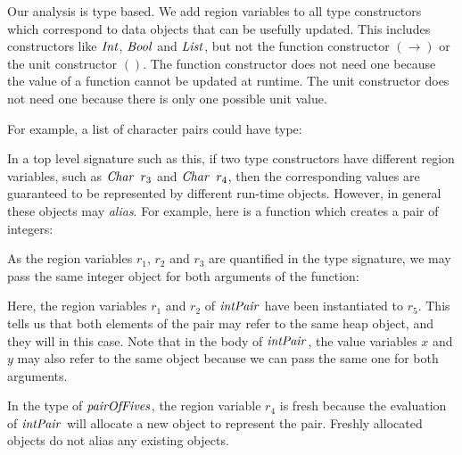 Our analysis is type based. We add region variables to all type constructors which correspond to data objects that can be usefully updated. This includes constructors like $\operatorname{\mathit{Int}}$, $\operatorname{\mathit{Bool}}$ and $\operatorname{\mathit{List}}$, but not the function constructor $(\rightarrow)$ or the unit constructor $()$. The function constructor does not need one because the value of a function cannot be updated at runtime. The unit constructor does not need one because there is only one possible unit value.  

For example, a list of character pairs could have type:


In a top level signature such as this, if two type constructors have different region variables, such as $\iChar \ r_3$ and $\operatorname{\mathit{Char}} \ r_4$, then the corresponding values are guaranteed to be represented by different run-time objects. However, in general these objects may \emph{alias}. For example, here is a function which creates a pair of integers:



As the region variables $r_1$, $r_2$ and $r_3$ are quantified in the type signature, we may pass the same integer object for both arguments of the function:


\vspace{-1ex}

Here, the region variables $r_1$ and $r_2$ of $\operatorname{\mathit{intPair}}$ have been instantiated to $r_5$. This tells us that both elements of the pair may refer to the same heap object, and they will in this case. Note that in the body of $\operatorname{\mathit{intPair}}$, the value variables $x$ and $y$ may also refer to the same object because we can pass the same one for both arguments.

In the type of $\operatorname{\mathit{pairOfFives}}$, the region variable $r_4$ is fresh because the evaluation of $\operatorname{\mathit{intPair}}$ will allocate a new object to represent the pair. Freshly allocated objects do not alias any existing objects.

